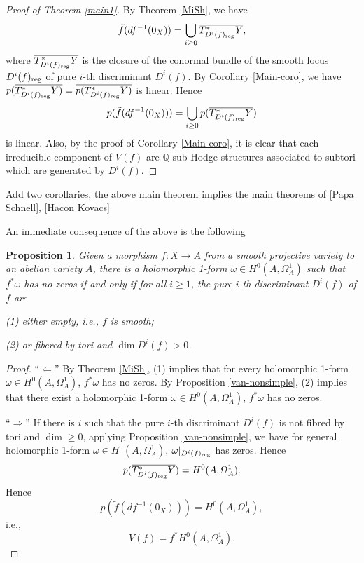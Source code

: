 \documentclass[a4paper,12pt,reqno]{amsart}
\theoremstyle{plain}
\newtheorem{proposition}[theorem]{Proposition}
\theoremstyle{remark}
\newcommand{\Q}{\mathbb Q}
\begin{document}
\begin{proof}[Proof of Theorem \ref{main1}]
By Theorem \ref{MiSh}, we have $$\tilde{f}(df^{-1}(0_X))=\bigcup_{i\geq0}\overline{T^*_{D^i(f)_{\textnormal{reg}}}Y},$$ where $\overline{T^*_{D^i(f)_{\textnormal{reg}}}Y}$ is the closure of the conormal bundle of the smooth locus $D^i(f)_{\textnormal{reg}}$ of pure $i$-th discriminant $D^i(f)$. By Corollary \ref{Main-coro}, we have $p(\overline{T^*_{D^i(f)_{\textnormal{reg}}}Y)}=\overline{p(T^*_{D^i(f)_{\textnormal{reg}}}Y)}$ is linear. Hence $$p(\tilde{f}(df^{-1}(0_X)))=\bigcup_{i\geq0}p(\overline{T^*_{D^i(f)_{\textnormal{reg}}}Y})$$ is linear. Also, by the proof of Corollary \ref{Main-coro}, it is clear that each irreducible component of $V(f)$ are $\Q$-sub Hodge structures associated to subtori which are generated by $D^i(f)$.
\end{proof}




{\color{red} Add two corollaries, the above main theorem implies the main theorems of [Papa Schnell], [Hacon Kovacs]}

An immediate consequence of the above is the
following

\begin{proposition}
Given a morphism $f\colon X\to A$ from a smooth 
projective variety to an abelian variety $A$, there is a holomorphic 1-form $\omega\in H^0(A, \Omega_A^1)$ such that $f^*\omega$ has no zeros if and only
if for all $i\geq1$, the pure $i$-th discriminant $D^i(f)$ of $f$ are

(1) either empty, i.e., $f$ is smooth;

(2) or fibered by tori and $\dim D^i(f)>0$. 
\label{thm:nonvanishing}
\end{proposition}

\begin{proof} ``$\Leftarrow$'' By Theorem \ref{MiSh}, (1) implies that for every holomorphic 1-form $\omega\in H^0(A, \Omega_A^1)$, $f^*\omega$ has no zeros. By Proposition \ref{van-nonsimple}, (2) implies that there exist a holomorphic 1-form $\omega\in H^0(A, \Omega_A^1)$, $f^*\omega$ has no zeros.


``$\Rightarrow$'' 
If there is $i$ such that the pure $i$-th discriminant $D^i(f)$ is not fibred by tori and $\dim\geq 0$, applying Proposition \ref{van-nonsimple}, we have for general holomorphic 1-form $\omega\in H^0(A, \Omega_A^1)$, $\omega|_{D^i(f)_{\textnormal{reg}}}$ has zeros. Hence $$p(\overline{T^*_{D^i(f)_{\textnormal{reg}}}Y})=H^0(A, \Omega_A^1).$$ Hence $$p(\tilde{f}(df^{-1}(0_X)))=H^0(A, \Omega_A^1),$$ i.e.,$$V(f)=f^*H^0(A, \Omega_A^1).$$
\end{proof}
\end{document}
